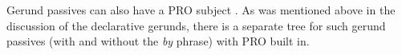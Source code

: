 Gerund passives can also have a PRO subject . As was mentioned above
in the discussion of the declarative gerunds, there is a separate tree for
such gerund passives (with and without the {\it by} phrase) with PRO built
in.






























